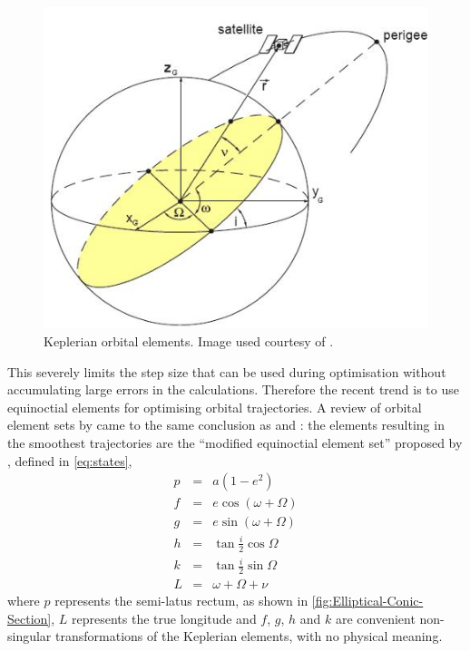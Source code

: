 \begin{figure} [h]
\caption{Keplerian orbital elements. Image used courtesy of \textcite{Keppeler_thesis}.}
\label{fig:Keplerian-Orbital-Elements}
\centering
\includegraphics[scale=0.75]{Images/Keplerian-elements.JPG}
\end{figure}

This severely limits the step size that can be used during optimisation without accumulating large errors in the calculations. Therefore the recent trend is to use equinoctial elements for optimising orbital trajectories. A review of orbital element sets by \textcite{Hintz2008} came to the same conclusion as \citeauthor{Letterio_thesis} and \citeauthor{Keppeler_thesis}: the elements resulting in the smoothest trajectories are the \enquote{modified equinoctial element set} proposed by \textcite{Walker1985}, defined in \eqref{eq:states},
\begin{subequations}\label{eq:states}
\begin{eqnarray}
p & = & a(1-e^{2}) \label{eq:p}\\
f & = & e\cos(\omega+\Omega) \label{eq:f}\\
g & = & e\sin(\omega+\Omega) \label{eq:g}\\
h & = & \tan\frac{i}{2}\cos\Omega \label{eq:h}\\
k & = & \tan\frac{i}{2}\sin\Omega \label{eq:k}\\
L & = & \omega+\Omega+\nu \label{eq:L}
\end{eqnarray}
\end{subequations}
where $p$ represents the semi-latus rectum, as shown in \autoref{fig:Elliptical-Conic-Section}, $L$ represents the true longitude and $f$, $g$, $h$ and $k$ are convenient non-singular transformations of the Keplerian elements, with no physical meaning.

